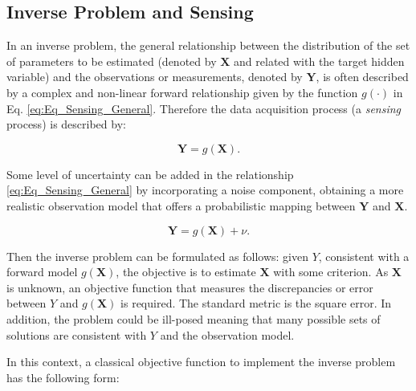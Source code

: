 \subsection{Inverse Problem and Sensing}
\label{sec_intro_Inverseproblem}

In an inverse problem, the general relationship between the distribution of the set of parameters to be estimated (denoted by $\mathbf{X}$ and related with the target hidden variable) and the observations or measurements, denoted by $\mathbf{Y}$, is often described by a complex and non-linear forward relationship given by the function $g(\cdot)$ in Eq. \eqref{eq:Eq_Sensing_General}. Therefore the data acquisition process (a \emph{sensing} process) is described by:

\begin{equation}
\label{eq:Eq_Sensing_General}
	\mathbf{Y} = g(\mathbf{X}) .
\end{equation}


Some level of uncertainty can be added in the relationship \eqref{eq:Eq_Sensing_General} by incorporating a noise component, obtaining a more realistic observation model that offers a probabilistic mapping between $\mathbf{Y}$ and $\mathbf{X}$.

\begin{equation}
\label{eq:Eq_Sensing_General_Noise}
	\mathbf{Y} = g(\mathbf{X}) + \nu .
\end{equation}



Then the inverse problem can be formulated as follows: given $Y$, consistent with a forward model $g(\mathbf{X})$, the objective is to estimate $\mathbf{X}$ with some criterion. As $\mathbf{X}$ is unknown, an objective function that measures the discrepancies or error between $Y$ and $g(\mathbf{X})$ is required. The standard metric is the square error. In addition, the problem could be ill-posed meaning that many possible sets of solutions are consistent with $Y$ and the observation model.

In this context, a classical objective function to implement the inverse problem has the following form:


